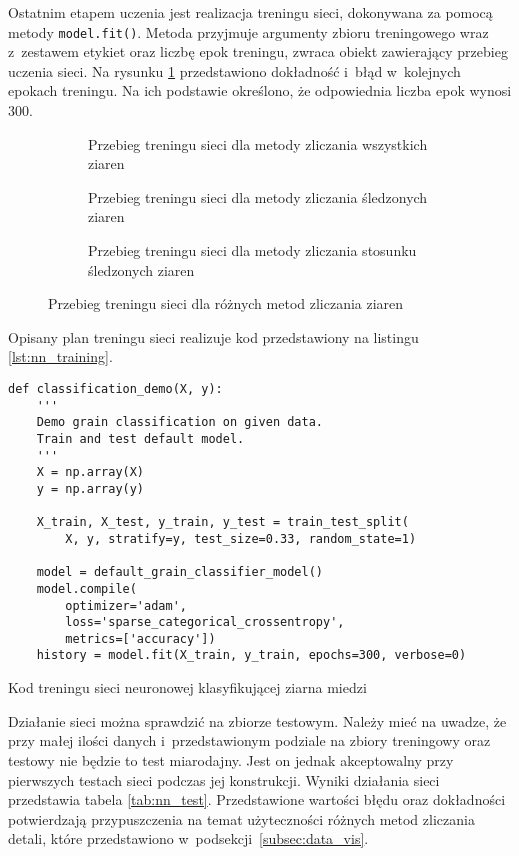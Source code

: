 Ostatnim etapem uczenia jest realizacja treningu sieci, dokonywana za
pomocą metody \texttt{model.fit()}.
Metoda przyjmuje argumenty zbioru treningowego wraz z~zestawem etykiet
oraz liczbę epok treningu, zwraca obiekt zawierający przebieg uczenia sieci.
Na rysunku \ref{fig:training_history} przedstawiono dokładność i~błąd
w~kolejnych epokach treningu.
Na ich podstawie określono, że odpowiednia liczba epok wynosi 300.
\begin{figure}[htb]
	\centering
	\begin{subfigure}[t]{0.3\textwidth}
		\centering
		
		\caption{Przebieg treningu sieci dla metody zliczania wszystkich
		         ziaren}
	\end{subfigure}
	\hfill
	\begin{subfigure}[t]{0.3\textwidth}
		\centering
		
		\caption{Przebieg treningu sieci dla metody zliczania śledzonych 
		         ziaren}
	\end{subfigure}
	\hfill
	\begin{subfigure}[t]{0.3\textwidth}
		\centering
		
		\caption{Przebieg treningu sieci dla metody zliczania stosunku
		         śledzonych ziaren}
	\end{subfigure}
	\caption{Przebieg treningu sieci dla różnych metod zliczania ziaren}
	\label{fig:training_history}
\end{figure}
Opisany plan treningu sieci realizuje kod przedstawiony na listingu
\ref{lst:nn_training}.
\begin{listing}[htb]
\begin{verbatim}
def classification_demo(X, y):
    '''
    Demo grain classification on given data.
    Train and test default model.
    '''
    X = np.array(X)
    y = np.array(y)

    X_train, X_test, y_train, y_test = train_test_split(
        X, y, stratify=y, test_size=0.33, random_state=1)

    model = default_grain_classifier_model()
    model.compile(
        optimizer='adam',
        loss='sparse_categorical_crossentropy',
        metrics=['accuracy'])
    history = model.fit(X_train, y_train, epochs=300, verbose=0)
\end{verbatim}
\caption{Kod treningu sieci neuronowej klasyfikującej ziarna miedzi}
\label{lst:nn_training}
\end{listing}

Działanie sieci można sprawdzić na zbiorze testowym.
Należy mieć na uwadze, że przy małej ilości danych i~przedstawionym
podziale na zbiory treningowy oraz testowy nie będzie to test miarodajny.
Jest on jednak akceptowalny przy pierwszych testach sieci podczas jej
konstrukcji.
Wyniki działania sieci przedstawia tabela \ref{tab:nn_test}.
Przedstawione wartości błędu oraz dokładności potwierdzają przypuszczenia
na temat użyteczności różnych metod zliczania detali, które przedstawiono
w~podsekcji~\ref{subsec:data_vis}.

